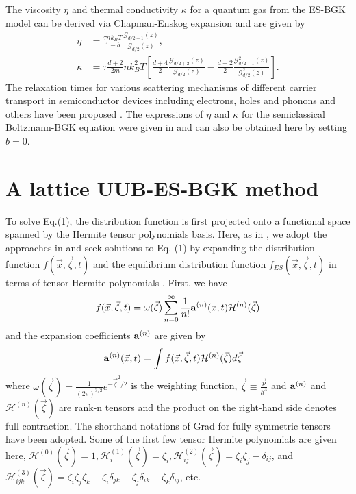 \documentclass[doublecol]{epl2}
\begin{document}
The viscosity $\eta$ and thermal conductivity $\kappa$ for a quantum gas from the ES-BGK model can be derived via Chapman-Enskog expansion \cite{Chapcow} and are given by \cite{Wu2012}
\begin{align}
\eta &= \frac{\tau n  k_B T}{1-b} \frac{\mathcal{G}_{d/2+1}(z)}{\mathcal{G}_{d/2}(z) }, \\
\kappa &= \tau \frac{d+2}{2m} n k_B^2 T [\frac{d+4}{2} \frac{\mathcal{G}_{d/2+2}(z)}{\mathcal{G}_{d/2}(z) } -\frac{d+2}{2}\frac{\mathcal{G}^2_{d/2+1}(z)}{\mathcal{G}^2_{d/2}(z)}].
\end{align}
The relaxation times for various scattering mechanisms of different carrier transport in semiconductor devices including electrons, holes and phonons and others have been proposed \cite{Lund2000, Chen2005}.  The expressions of $\eta$ and $\kappa$ for the semiclassical Boltzmann-BGK equation were given in \cite{Shi2008} and can also be obtained here by setting $b=0$.

\section{A lattice UUB-ES-BGK method}

To solve Eq.(1), the distribution function is first projected onto a functional space spanned by the Hermite tensor polynomials basis.
Here, as in \cite{Yang2009}, we adopt the approaches in \cite{Shan2006, Zhang2013} and seek solutions to Eq. (1) by expanding the distribution function $f(\vec x,\vec \zeta, t)$ and the equilibrium distribution function $f_{ES}(\vec x, \vec\zeta, t)$ in terms of tensor Hermite polynomials \cite{Grad1949}.  First, we have
\begin{align}
 f(\vec x,\vec\zeta ,t) =\omega (\vec\zeta )\sum _{n=0}^{\infty}
\frac{1}{n!} {\bf a}^{(n)}(x,t) {{\mathcal H}}^{(n)} (\vec\zeta )
\end{align}
and the expansion coefficients ${\bf a}^{(n)}$ are given by
\begin{align}
{\bf a}^{(n)} (\vec x,t)&=\int f(\vec x,\vec\zeta ,t) {{\mathcal H}}^{(n)}(\vec\zeta) d\vec\zeta
\label{eq:expasion_coefs}
\end{align}
where $\omega (\vec\zeta) = \frac{1}{(2\pi)^{3/2} } e^{-\vec\zeta^2/2}$ is the weighting function, $\vec\zeta \equiv \frac{\vec p}{h^3}$ and ${\bf a}^{(n)}$ and ${{\mathcal H} }^{(n)} (\vec\zeta )$ are rank-n tensors and the product on the right-hand side denotes full contraction.   The shorthand notations of Grad \cite{Grad1949} for fully symmetric tensors have been adopted.
Some of the first few tensor Hermite polynomials are given here, ${{\mathcal H}}^{(0)} (\vec\zeta ) = 1, {{\mathcal H}} _{i}^{(1)} (\vec\zeta )=\zeta _{i}, {{\mathcal H}}_{ij}^{(2)} (\vec\zeta ) =\zeta _{i} \zeta _{j} - \delta _{ij}$, and ${{\mathcal H}}_{ijk}^{(3)} (\vec\zeta ) =\zeta _{i} \zeta _{j} \zeta _{k}-\zeta _{i}\delta_{jk} -\zeta _{j}\delta _{ik} -\zeta _{k} \delta _{ij}$, etc.
\end{document}
